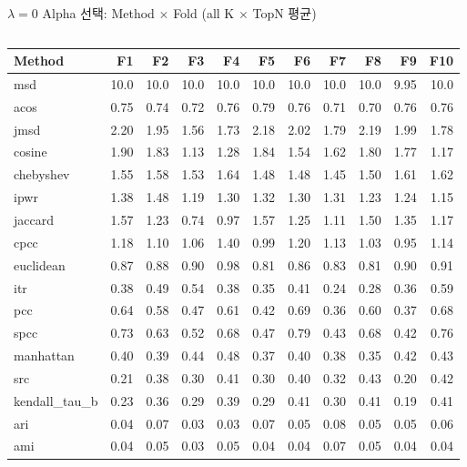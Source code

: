 \documentclass[aspectratio=169,10pt]{beamer}
\begin{document}
\begin{frame}[shrink=8]{$\lambda=0$ Alpha 선택: Method $\times$ Fold \textnormal{\small(all K $\times$ TopN 평균)}}
	\begin{columns}[T]
			\renewcommand{\arraystretch}{1.1}
			\scriptsize
			\begin{tabular}{l|rrrrrrrrrr}
				\toprule
				Method & F1 & F2 & F3 & F4 & F5 & F6 & F7 & F8 & F9 & F10 \\
				\midrule
				msd     & 10.0 & 10.0 & 10.0 & 10.0 & 10.0 & 10.0 & 10.0 & 10.0 & 9.95 & 10.0 \\
				acos    & 0.75 & 0.74 & 0.72 & 0.76 & 0.79 & 0.76 & 0.71 & 0.70 & 0.76 & 0.76 \\
				jmsd    & 2.20 & 1.95 & 1.56 & 1.73 & 2.18 & 2.02 & 1.79 & 2.19 & 1.99 & 1.78 \\
				cosine  & 1.90 & 1.83 & 1.13 & 1.28 & 1.84 & 1.54 & 1.62 & 1.80 & 1.77 & 1.17 \\
				chebyshev & 1.55 & 1.58 & 1.53 & 1.64 & 1.48 & 1.48 & 1.45 & 1.50 & 1.61 & 1.62 \\
				ipwr    & 1.38 & 1.48 & 1.19 & 1.30 & 1.32 & 1.30 & 1.31 & 1.23 & 1.24 & 1.15 \\
				jaccard & 1.57 & 1.23 & 0.74 & 0.97 & 1.57 & 1.25 & 1.11 & 1.50 & 1.35 & 1.17 \\
				cpcc    & 1.18 & 1.10 & 1.06 & 1.40 & 0.99 & 1.20 & 1.13 & 1.03 & 0.95 & 1.14 \\
				euclidean & 0.87 & 0.88 & 0.90 & 0.98 & 0.81 & 0.86 & 0.83 & 0.81 & 0.90 & 0.91 \\
				itr     & 0.38 & 0.49 & 0.54 & 0.38 & 0.35 & 0.41 & 0.24 & 0.28 & 0.36 & 0.59 \\
				pcc     & 0.64 & 0.58 & 0.47 & 0.61 & 0.42 & 0.69 & 0.36 & 0.60 & 0.37 & 0.68 \\
				spcc    & 0.73 & 0.63 & 0.52 & 0.68 & 0.47 & 0.79 & 0.43 & 0.68 & 0.42 & 0.76 \\
				manhattan & 0.40 & 0.39 & 0.44 & 0.48 & 0.37 & 0.40 & 0.38 & 0.35 & 0.42 & 0.43 \\
				src     & 0.21 & 0.38 & 0.30 & 0.41 & 0.30 & 0.40 & 0.32 & 0.43 & 0.20 & 0.42 \\
				kendall\_tau\_b & 0.23 & 0.36 & 0.29 & 0.39 & 0.29 & 0.41 & 0.30 & 0.41 & 0.19 & 0.41 \\
				ari     & 0.04 & 0.07 & 0.03 & 0.03 & 0.07 & 0.05 & 0.08 & 0.05 & 0.05 & 0.06 \\
				ami     & 0.04 & 0.05 & 0.03 & 0.05 & 0.04 & 0.04 & 0.07 & 0.05 & 0.04 & 0.04 \\
				\bottomrule
			\end{tabular}


\end{columns}
\end{frame}
\end{document}
